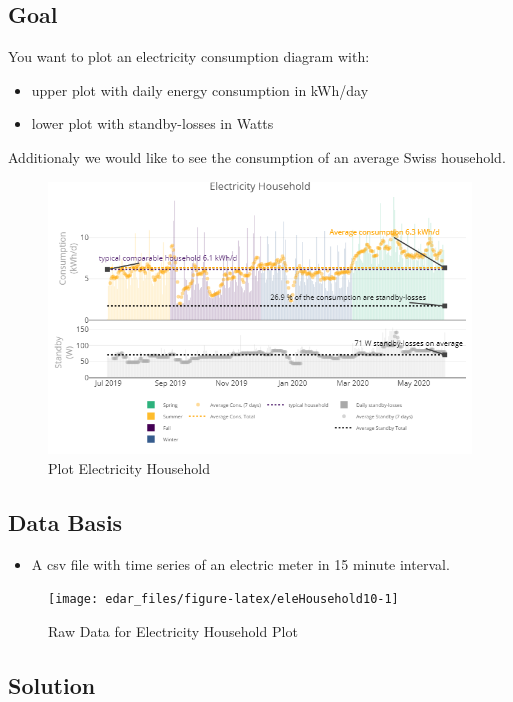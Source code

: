 \documentclass[
  a4paperpaper,
]{book}
\providecommand{\tightlist}{%
  \setlength{\itemsep}{0pt}\setlength{\parskip}{0pt}}
\begin{document}
\hypertarget{goal-16}{%
\subsection{Goal}\label{goal-16}}

You want to plot an electricity consumption diagram with:

\begin{itemize}
\tightlist
\item
  upper plot with daily energy consumption in kWh/day
\item
  lower plot with standby-losses in Watts
\end{itemize}

Additionaly we would like to see the consumption of an average Swiss household.

\begin{figure}
\includegraphics[width=0.7\linewidth]{images/eleHousehold} \caption{Plot Electricity Household}\label{fig:unnamed-chunk-26}
\end{figure}

\hypertarget{data-basis-16}{%
\subsection{Data Basis}\label{data-basis-16}}

\begin{itemize}
\tightlist
\item
  A csv file with time series of an electric meter in 15 minute interval.
\end{itemize}

\begin{figure}
\texttt{[image: edar\_files/figure-latex/eleHousehold10-1]} \caption{Raw Data for Electricity Household Plot}\label{fig:eleHousehold10}
\end{figure}

\newpage

\hypertarget{solution-16}{%
\subsection{Solution}\label{solution-16}}
\end{document}
